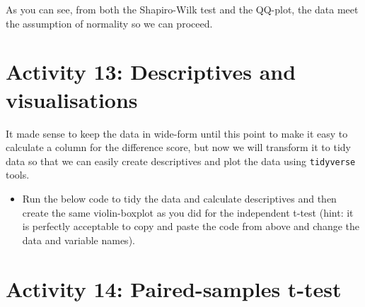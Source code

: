 \documentclass[]{book}
\newenvironment{Shaded}{\begin{snugshade}}{\end{snugshade}}
\newcommand{\DataTypeTok}[1]{\textcolor[rgb]{0.13,0.29,0.53}{#1}}
\newcommand{\KeywordTok}[1]{\textcolor[rgb]{0.13,0.29,0.53}{\textbf{#1}}}
\newcommand{\NormalTok}[1]{#1}
\newcommand{\OperatorTok}[1]{\textcolor[rgb]{0.81,0.36,0.00}{\textbf{#1}}}
\newcommand{\OtherTok}[1]{\textcolor[rgb]{0.56,0.35,0.01}{#1}}
\newcommand{\StringTok}[1]{\textcolor[rgb]{0.31,0.60,0.02}{#1}}
\providecommand{\tightlist}{%
  \setlength{\itemsep}{0pt}\setlength{\parskip}{0pt}}
\begin{document}
As you can see, from both the Shapiro-Wilk test and the QQ-plot, the data meet the assumption of normality so we can proceed.

\hypertarget{activity-13-descriptives-and-visualisations}{%
\section{Activity 13: Descriptives and visualisations}\label{activity-13-descriptives-and-visualisations}}

It made sense to keep the data in wide-form until this point to make it easy to calculate a column for the difference score, but now we will transform it to tidy data so that we can easily create descriptives and plot the data using \texttt{tidyverse} tools.

\begin{itemize}
\tightlist
\item
  Run the below code to tidy the data and calculate descriptives and then create the same violin-boxplot as you did for the independent t-test (hint: it is perfectly acceptable to copy and paste the code from above and change the data and variable names).
\end{itemize}

\begin{Shaded}
\end{Shaded}

\hypertarget{activity-14-paired-samples-t-test}{%
\section{Activity 14: Paired-samples t-test}\label{activity-14-paired-samples-t-test}}
\end{document}

